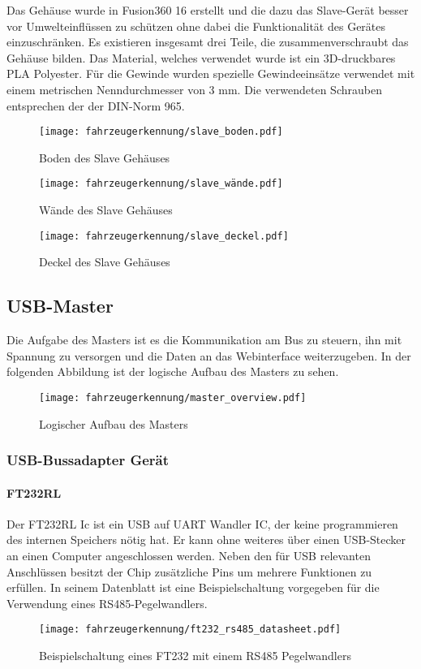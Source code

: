 Das Gehäuse wurde in Fusion360 16 erstellt und die dazu das Slave-Gerät besser vor Umwelteinflüssen zu schützen ohne dabei die Funktionalität des Gerätes einzuschränken. Es existieren insgesamt
drei Teile, die zusammenverschraubt das Gehäuse bilden. Das Material, welches verwendet wurde
ist ein 3D-druckbares PLA Polyester. Für die Gewinde wurden spezielle Gewindeeinsätze verwendet
mit einem metrischen Nenndurchmesser von 3 mm. Die verwendeten Schrauben entsprechen der
der DIN-Norm 965.

\begin{figure}[!htb]
        \texttt{[image: fahrzeugerkennung/slave\_boden.pdf]}
        \caption{Boden des Slave Gehäuses}
    \endminipage\hfill
        \texttt{[image: fahrzeugerkennung/slave\_wände.pdf]}
        \caption{Wände des Slave Gehäuses}
    \endminipage\hfill
        \texttt{[image: fahrzeugerkennung/slave\_deckel.pdf]}
        \caption{Deckel des Slave Gehäuses}
    \endminipage
\end{figure}

\subsection{USB-Master}
Die Aufgabe des Masters ist es die Kommunikation am Bus zu steuern, ihn mit Spannung zu versorgen und die Daten an das Webinterface weiterzugeben. 
In der folgenden Abbildung ist der logische Aufbau des Masters zu sehen.

\begin{figure}[H]
    \centering
    \texttt{[image: fahrzeugerkennung/master\_overview.pdf]}
    \caption{Logischer Aufbau des Masters}
\end{figure}
\subsubsection{USB-Bussadapter Gerät}
\paragraph{FT232RL}\mbox{} 

Der FT232RL Ic ist ein USB auf UART Wandler IC, der keine programmieren des internen Speichers nötig hat. Er kann ohne weiteres über einen USB-Stecker an einen Computer angeschlossen werden. 
Neben den für USB relevanten Anschlüssen besitzt der Chip zusätzliche Pins um mehrere Funktionen zu erfüllen. In seinem Datenblatt ist eine Beispielschaltung vorgegeben für die Verwendung eines RS485-Pegelwandlers.
\begin{figure}[H]
    \centering
    \texttt{[image: fahrzeugerkennung/ft232\_rs485\_datasheet.pdf]}
    \caption{Beispielschaltung eines FT232 mit einem RS485 Pegelwandlers}
\end{figure}

